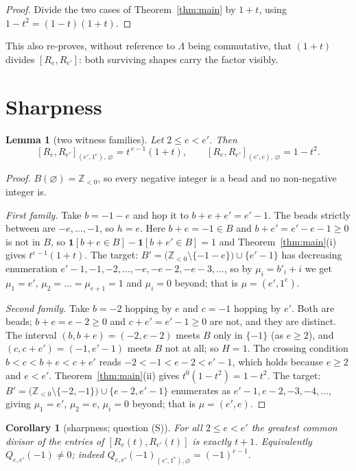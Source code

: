 \documentclass[11pt]{article}
\newtheorem{lemma}[theorem]{Lemma}
\newtheorem{corollary}[theorem]{Corollary}
\theoremstyle{definition}
\newcommand{\Lam}{\Lambda}
\newcommand{\Z}{\mathbb{Z}}
\newcommand{\one}{\mathbf{1}}
\begin{document}
\begin{proof}
Divide the two cases of Theorem~\ref{thm:main} by $1+t$, using $1-t^2=(1-t)(1+t)$.
\end{proof}

This also re-proves, without reference to $\Lam$ being commutative, that $(1+t)$ divides
$[R_e,R_{e'}]$: both surviving shapes carry the factor visibly.

\section{Sharpness}

\begin{lemma}[two witness families]\label{lem:wit-k2}
Let $2\le e<e'$. Then
\[
[R_e,R_{e'}]_{(e',1^e),\,\varnothing}=t^{\,e-1}(1+t),
\qquad
[R_e,R_{e'}]_{(e',e),\,\varnothing}=1-t^2 .
\]
\end{lemma}

\begin{proof}
$B(\varnothing)=\Z_{<0}$, so every negative integer is a bead and no non-negative integer is.

\emph{First family.} Take $b=-1-e$ and hop it to $b+e+e'=e'-1$. The beads strictly between are
$-e,\dots,-1$, so $h=e$. Here $b+e=-1\in B$ and $b+e'=e'-e-1\ge0$ is not in $B$, so
$\one[b+e\in B]-\one[b+e'\in B]=1$ and Theorem~\ref{thm:main}(i) gives $t^{e-1}(1+t)$. The
target: $B'=\bigl(\Z_{<0}\setminus\{-1-e\}\bigr)\cup\{e'-1\}$ has decreasing enumeration
$e'-1,-1,-2,\dots,-e,-e-2,-e-3,\dots$, so by $\mu_i=b'_i+i$ we get
$\mu_1=e'$, $\mu_2=\dots=\mu_{e+1}=1$ and $\mu_i=0$ beyond; that is $\mu=(e',1^e)$.

\emph{Second family.} Take $b=-2$ hopping by $e$ and $c=-1$ hopping by $e'$. Both are beads;
$b+e=e-2\ge0$ and $c+e'=e'-1\ge0$ are not, and they are distinct. The interval $(b,b+e)=(-2,e-2)$
meets $B$ only in $\{-1\}$ (as $e\ge2$), and $(c,c+e')=(-1,e'-1)$ meets $B$ not at all; so $H=1$.
The crossing condition $b<c<b+e<c+e'$ reads $-2<-1<e-2<e'-1$, which holds because $e\ge2$ and
$e<e'$. Theorem~\ref{thm:main}(ii) gives $t^{0}(1-t^2)=1-t^2$. The target:
$B'=\bigl(\Z_{<0}\setminus\{-2,-1\}\bigr)\cup\{e-2,e'-1\}$ enumerates as
$e'-1,e-2,-3,-4,\dots$, giving $\mu_1=e'$, $\mu_2=e$, $\mu_i=0$ beyond; that is $\mu=(e',e)$.
\end{proof}

\begin{corollary}[sharpness; question (S)]\label{cor:sharp}
For all $2\le e<e'$ the greatest common divisor of the entries of $[R_e(t),R_{e'}(t)]$ is exactly
$t+1$. Equivalently $Q_{e,e'}(-1)\ne0$; indeed $Q_{e,e'}(-1)_{(e',1^e),\varnothing}=(-1)^{e-1}$.
\end{corollary}
\end{document}
